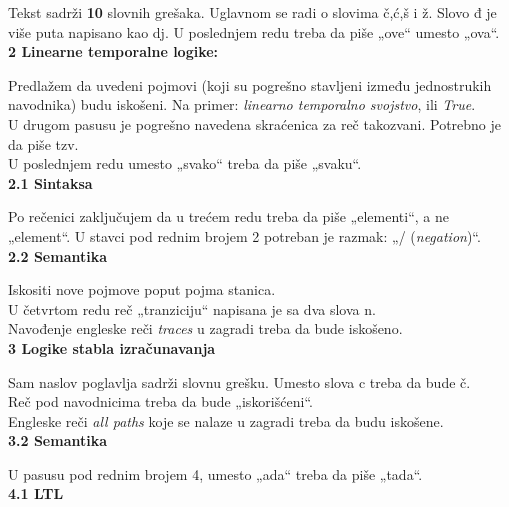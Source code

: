 \documentclass[a4paper]{report}
\begin{document}
Tekst sadrži \textbf{10} slovnih grešaka. Uglavnom se radi o slovima č,ć,š i ž. Slovo đ je više puta napisano kao dj. U poslednjem redu treba da piše „ove“ umesto „ova“.
\vspace{0.5cm}\\
\textbf{2 Linearne temporalne logike:}

Predlažem da uvedeni pojmovi (koji su pogrešno stavljeni između jednostrukih navodnika) budu iskošeni. 
Na primer: \textit{linearno temporalno svojstvo}, ili \textit{True}.
\\U drugom pasusu je pogrešno navedena skraćenica za reč takozvani. Potrebno je da piše tzv.
\\U poslednjem redu umesto „svako“ treba da piše „svaku“.
\vspace{0.5cm}\\
\textbf{2.1 Sintaksa}

Po rečenici zaključujem da u trećem redu treba da piše „elementi“, a ne „element“.  
U stavci pod rednim brojem 2 potreban je razmak: „/ (\textit{negation})“.
\vspace{0.5cm}\\
\textbf{2.2 Semantika}

Iskositi nove pojmove poput pojma stanica.
\\U četvrtom redu reč „tranziciju“ napisana je sa dva slova n.
\\Navođenje engleske reči \textit{traces} u zagradi treba da bude iskošeno.  
\vspace{0.5cm}\\
\textbf{3 Logike stabla izračunavanja}

Sam naslov poglavlja sadrži slovnu grešku. Umesto slova c treba da bude č.
\\Reč pod navodnicima treba da bude „iskorišćeni“.
\\Engleske reči \textit{all paths} koje se nalaze u zagradi treba da budu iskošene.
\vspace{0.5cm}\\
\textbf{3.2 Semantika}

U pasusu pod rednim brojem 4, umesto „ada“ treba da piše „tada“.
\vspace{0.5cm}\\
\textbf{4.1 LTL}
\end{document}
